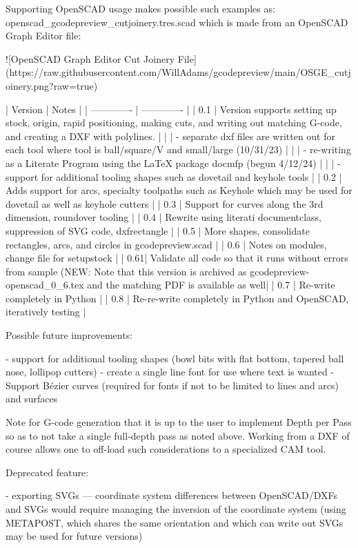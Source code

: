 \documentclass{ltxdoc}
\begin{document}
\begin{readme}
Supporting OpenSCAD usage makes possible such examples as: openscad_gcodepreview_cutjoinery.tres.scad which is made from an OpenSCAD Graph Editor file:

![OpenSCAD Graph Editor Cut Joinery File](https://raw.githubusercontent.com/WillAdams/gcodepreview/main/OSGE_cutjoinery.png?raw=true)

| Version       | Notes         |
| ------------- | ------------- |
| 0.1 | Version  supports setting up stock, origin, rapid positioning, making cuts, and writing out matching G-code, and creating a DXF with polylines. |
|     |  - separate dxf files are written out for each tool where tool is ball/square/V and small/large (10/31/23)           |
|     |  - re-writing as a Literate Program using the LaTeX package docmfp (begun 4/12/24)                                   |
|     |  - support for additional tooling shapes such as dovetail and keyhole tools                                          |
| 0.2 | Adds support for arcs, specialty toolpaths such as Keyhole which may be used for dovetail as well as keyhole cutters |
| 0.3 | Support for curves along the 3rd dimension, roundover tooling                                                        |
| 0.4 | Rewrite using literati documentclass, suppression of SVG code, dxfrectangle                                          |
| 0.5 | More shapes, consolidate rectangles, arcs, and circles in gcodepreview.scad                                          |
| 0.6 | Notes on modules, change file for setupstock                                                                         |
| 0.61| Validate all code so that it runs without errors from sample (NEW: Note that this version is archived as gcodepreview-openscad_0_6.tex and the matching PDF is available as well|
| 0.7 | Re-write completely in Python                                                                                        |
| 0.8 | Re-re-write completely in Python and OpenSCAD, iteratively testing |

Possible future improvements:

 - support for additional tooling shapes (bowl bits with flat bottom, tapered ball nose, lollipop cutters)
 - create a single line font for use where text is wanted
 - Support Bézier curves (required for fonts if not to be limited to lines and arcs) and surfaces

Note for G-code generation that it is up to the user to implement Depth per Pass so as to not take a single full-depth pass as noted above. Working from a DXF of course allows one to off-load such considerations to a specialized CAM tool.

Deprecated feature:

 - exporting SVGs --- coordinate system differences between OpenSCAD/DXFs and SVGs would require managing the inversion of the coordinate system (using METAPOST, which shares the same orientation and which can write out SVGs may be used for future versions)

\end{readme}
\end{document}
